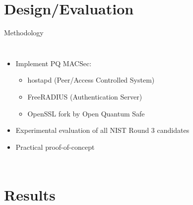 \documentclass[fleqn,compress,utf8,aspectratio=169,t]{beamer}
\begin{document}
\section{Design/Evaluation}

\begin{frame}{Methodology}
  \begin{columns}[T]
    \begin{itemize}
      \item<2-> Implement PQ MACSec:
      \begin{itemize}
        \item hostapd (Peer/Access Controlled System)
        \item FreeRADIUS (Authentication Server)
        \item OpenSSL fork by Open Quantum Safe
      \end{itemize}
      \item<3-> Experimental evaluation of all NIST Round 3 candidates
      \item<4-> Practical proof-of-concept
    \end{itemize}
\end{columns}
\end{frame}

\section{Results}
\end{document}
